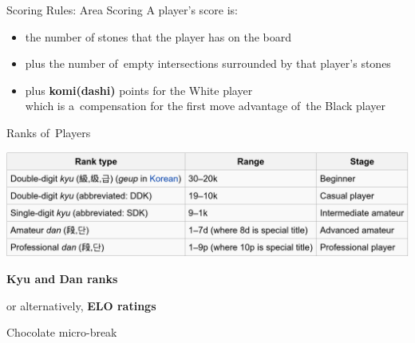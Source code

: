 \documentclass{beamer}
\begin{document}
  {
    \begin{frame}{Scoring Rules: Area Scoring}
      \pause
      A player's score is:
      \begin{itemize}[<+- | alert@+>]
        \item the number of stones that the player has on the board
        \item plus the number of~empty intersections surrounded by that player's stones
        \item plus \textbf{komi(dashi)} points for the White player \\
          {\tiny which is a~compensation for the first move advantage of~the Black player}
      \end{itemize}
    \end{frame}

    \begin{frame}{Ranks of~Players}
      \begin{center}
        \tiny
        \includegraphics[width=\textwidth]{../img/Go_kyu_dan.png}

        \textbf{Kyu and Dan ranks}
      \end{center}
      \pause
      
      or alternatively, \textbf{ELO ratings}
    \end{frame}
  }

  {
    \begin{frame}
      Chocolate micro-break
    \end{frame}
  }
\end{document}
